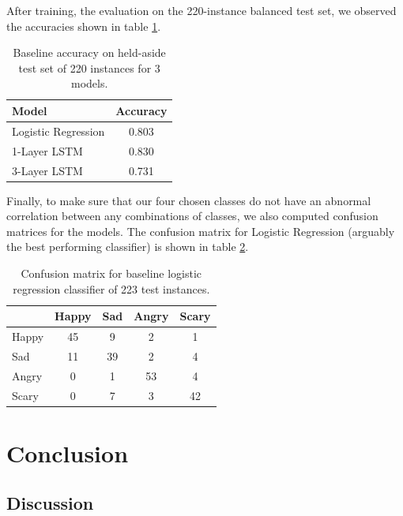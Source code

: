 \documentclass{article}
\begin{document}
After training, the evaluation on  the 220-instance balanced test set, we observed the accuracies shown in table \ref{tbl:baseline_acc}.
\begin{table}[] 
\caption{Baseline accuracy on held-aside test set of 220 instances for 3 models.}
\label{tbl:baseline_acc}
\centering
\begin{tabular}{lc} 
\toprule
\hline
Model & Accuracy \\ 
\midrule
Logistic Regression & 0.803 \\
1-Layer LSTM & 0.830 \\ 
3-Layer LSTM & 0.731 \\ 
\bottomrule
\end{tabular}
\end{table}

Finally, to make sure that our four chosen classes do not have an abnormal correlation between any combinations of classes, we also computed confusion matrices for the models. The confusion matrix for Logistic Regression (arguably the best performing classifier) is shown in table \ref{tbl:baseline_conf}.

\begin{table}[] 
\caption{Confusion matrix for baseline logistic regression classifier of 223 test instances.}
\label{tbl:baseline_conf}
\centering
\begin{tabular}{lcccc} 
\toprule
\hline
 & Happy & Sad & Angry & Scary \\ 
\midrule
Happy & 45 &  9 & 2 & 1 \\
Sad   &  11 & 39 & 2 & 4 \\
Angry &  0 &  1 & 53 & 4 \\
Scary &  0 &  7 & 3 &  42 \\
\bottomrule
\end{tabular}
\end{table}

\section{Conclusion}

\subsection{Discussion}
\end{document}

